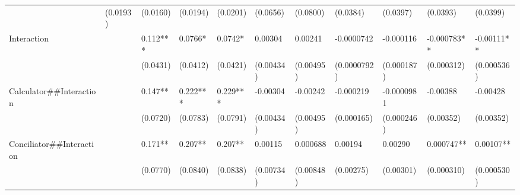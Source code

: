 \begin{tabular}{rrrrrrrrrrr}
\multicolumn{1}{l}{} & \multicolumn{1}{l}{(0.0193)} & \multicolumn{1}{l}{(0.0160)} & \multicolumn{1}{l}{(0.0194)} & \multicolumn{1}{l}{(0.0201)} & \multicolumn{1}{l}{(0.0656)} & \multicolumn{1}{l}{(0.0800)} & \multicolumn{1}{l}{(0.0384)} & \multicolumn{1}{l}{(0.0397)} & \multicolumn{1}{l}{(0.0393)} & \multicolumn{1}{l}{(0.0399)} \\
\multicolumn{1}{l}{Interaction} & \multicolumn{1}{l}{} & \multicolumn{1}{l}{0.112***} & \multicolumn{1}{l}{0.0766*} & \multicolumn{1}{l}{0.0742*} & \multicolumn{1}{l}{0.00304} & \multicolumn{1}{l}{0.00241} & \multicolumn{1}{l}{-0.0000742} & \multicolumn{1}{l}{-0.000116} & \multicolumn{1}{l}{-0.000783**} & \multicolumn{1}{l}{-0.00111**} \\
\multicolumn{1}{l}{} & \multicolumn{1}{l}{} & \multicolumn{1}{l}{(0.0431)} & \multicolumn{1}{l}{(0.0412)} & \multicolumn{1}{l}{(0.0421)} & \multicolumn{1}{l}{(0.00434)} & \multicolumn{1}{l}{(0.00495)} & \multicolumn{1}{l}{(0.0000792)} & \multicolumn{1}{l}{(0.000187)} & \multicolumn{1}{l}{(0.000312)} & \multicolumn{1}{l}{(0.000536)} \\
\multicolumn{1}{l}{Calculator\#\#Interaction} & \multicolumn{1}{l}{} & \multicolumn{1}{l}{0.147**} & \multicolumn{1}{l}{0.222***} & \multicolumn{1}{l}{0.229***} & \multicolumn{1}{l}{-0.00304} & \multicolumn{1}{l}{-0.00242} & \multicolumn{1}{l}{-0.000219} & \multicolumn{1}{l}{-0.0000981} & \multicolumn{1}{l}{-0.00388} & \multicolumn{1}{l}{-0.00428} \\
\multicolumn{1}{l}{} & \multicolumn{1}{l}{} & \multicolumn{1}{l}{(0.0720)} & \multicolumn{1}{l}{(0.0783)} & \multicolumn{1}{l}{(0.0791)} & \multicolumn{1}{l}{(0.00434)} & \multicolumn{1}{l}{(0.00495)} & \multicolumn{1}{l}{(0.000165)} & \multicolumn{1}{l}{(0.000246)} & \multicolumn{1}{l}{(0.00352)} & \multicolumn{1}{l}{(0.00352)} \\
\multicolumn{1}{l}{Conciliator\#\#Interaction} & \multicolumn{1}{l}{} & \multicolumn{1}{l}{0.171**} & \multicolumn{1}{l}{0.207**} & \multicolumn{1}{l}{0.207**} & \multicolumn{1}{l}{0.00115} & \multicolumn{1}{l}{0.000688} & \multicolumn{1}{l}{0.00194} & \multicolumn{1}{l}{0.00290} & \multicolumn{1}{l}{0.000747**} & \multicolumn{1}{l}{0.00107**} \\
\multicolumn{1}{l}{} & \multicolumn{1}{l}{} & \multicolumn{1}{l}{(0.0770)} & \multicolumn{1}{l}{(0.0840)} & \multicolumn{1}{l}{(0.0838)} & \multicolumn{1}{l}{(0.00734)} & \multicolumn{1}{l}{(0.00848)} & \multicolumn{1}{l}{(0.00275)} & \multicolumn{1}{l}{(0.00301)} & \multicolumn{1}{l}{(0.000310)} & \multicolumn{1}{l}{(0.000530)} \\

\end{tabular}
